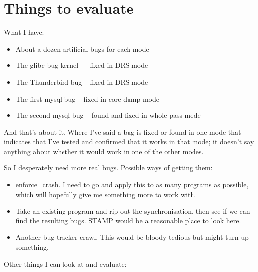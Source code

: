 \section{Things to evaluate}

What I have:

\begin{itemize}
\item About a dozen artificial bugs for each mode
\item The glibc bug kernel --- fixed in DRS mode
\item The Thunderbird bug -- fixed in DRS mode
\item The first mysql bug -- fixed in core dump mode
\item The second mysql bug -- found and fixed in whole-pass mode
\end{itemize}

And that's about it.
Where I've said a bug is fixed or found in one mode that indicates that I've tested and confirmed that it works in that mode; it doesn't say anything about whether it would work in one of the other modes.

So I desperately need more real bugs.
Possible ways of getting them:

\begin{itemize}
\item
  enforce\_crash.
  I need to go and apply this to as many programs as possible, which will hopefully give me something more to work with.
\item
  Take an existing program and rip out the synchronisation, then see if we can find the resulting bugs.
  STAMP would be a reasonable place to look here.
\item
  Another bug tracker crawl.
  This would be bloody tedious but might turn up something.
\end{itemize}

Other things I can look at and evaluate:

